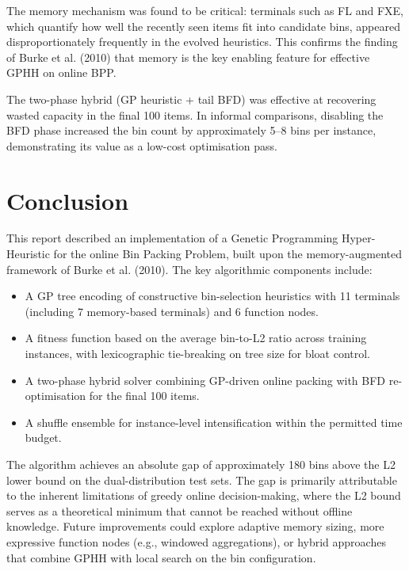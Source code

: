\documentclass[conference]{IEEEtran}
\begin{document}
The memory mechanism was found to be critical: terminals such as FL and FXE, which quantify how well the recently seen items fit into candidate bins, appeared disproportionately frequently in the evolved heuristics. This confirms the finding of Burke et al. (2010) that memory is the key enabling feature for effective GPHH on online BPP.

The two-phase hybrid (GP heuristic + tail BFD) was effective at recovering wasted capacity in the final 100 items. In informal comparisons, disabling the BFD phase increased the bin count by approximately 5--8 bins per instance, demonstrating its value as a low-cost optimisation pass.


\section{Conclusion}

This report described an implementation of a Genetic Programming Hyper-Heuristic for the online Bin Packing Problem, built upon the memory-augmented framework of Burke et al. (2010). The key algorithmic components include:

\begin{itemize}
\item A GP tree encoding of constructive bin-selection heuristics with 11 terminals (including 7 memory-based terminals) and 6 function nodes.
\item A fitness function based on the average bin-to-L2 ratio across training instances, with lexicographic tie-breaking on tree size for bloat control.
\item A two-phase hybrid solver combining GP-driven online packing with BFD re-optimisation for the final 100 items.
\item A shuffle ensemble for instance-level intensification within the permitted time budget.
\end{itemize}

The algorithm achieves an absolute gap of approximately 180 bins above the L2 lower bound on the dual-distribution test sets. The gap is primarily attributable to the inherent limitations of greedy online decision-making, where the L2 bound serves as a theoretical minimum that cannot be reached without offline knowledge. Future improvements could explore adaptive memory sizing, more expressive function nodes (e.g., windowed aggregations), or hybrid approaches that combine GPHH with local search on the bin configuration.
\end{document}
